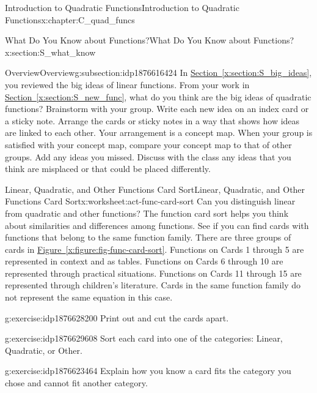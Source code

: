 \documentclass[oneside,10pt,]{book}
\newcommand{\xreffont}{\relax}
\numberwithin{equation}{chapter}
\begin{document}
\begin{chapterptx}{Introduction to Quadratic Functions}{}{Introduction to Quadratic Functions}{}{}{x:chapter:C_quad_funcs}
\begin{sectionptx}{What Do You Know about Functions?}{}{What Do You Know about Functions?}{}{}{x:section:S_what_know}
\begin{subsectionptx}{Overview}{}{Overview}{}{}{g:subsection:idp1876616424}
In \hyperref[x:section:S_big_ideas]{Section~{\xreffont\ref{x:section:S_big_ideas}}}, you reviewed the big ideas of linear functions. From your work in \hyperref[x:section:S_new_func]{Section~{\xreffont\ref{x:section:S_new_func}}\textendash{}{\xreffont\ref{x:section:S_func_fams}}}, what do you think are the big ideas of quadratic functions? Brainstorm with your group. Write each new idea on an index card or a sticky note. Arrange the cards or sticky notes in a way that shows how ideas are linked to each other. Your arrangement is a concept map. When your group is satisfied with your concept map, compare your concept map to that of other groups. Add any ideas you missed. Discuss with the class any ideas that you think are misplaced or that could be placed differently.%
\end{subsectionptx}
%
%
\typeout{************************************************}
\typeout{************************************************}
%
\begin{worksheet-subsection}{Linear, Quadratic, and Other Functions Card Sort}{}{Linear, Quadratic, and Other Functions Card Sort}{}{}{x:worksheet:act-func-card-sort}
Can you distinguish linear from quadratic and other functions? The function card sort helps you think about similarities and differences among functions. See if you can find cards with functions that belong to the same function family.%
There are three groups of cards in \hyperref[x:figure:fig-func-card-sort]{Figure~{\xreffont\ref{x:figure:fig-func-card-sort}}}. Functions on Cards 1 through 5 are represented in context and as tables. Functions on Cards 6 through 10 are represented through practical situations. Functions on Cards 11 through 15 are represented through children's literature. Cards in the same function family do not represent the same equation in this case.%
\begin{divisionexercise}{1}{}{}{g:exercise:idp1876628200}%
Print out and cut the cards apart.%
\end{divisionexercise}%
\begin{divisionexercise}{2}{}{}{g:exercise:idp1876629608}%
Sort each card into one of the categories: Linear, Quadratic, or Other.%
\end{divisionexercise}%
\begin{divisionexercise}{3}{}{}{g:exercise:idp1876623464}%
Explain how you know a card fits the category you chose and cannot fit another category.%

\end{divisionexercise}
\end{worksheet-subsection}
\end{sectionptx}
\end{chapterptx}
\end{document}
